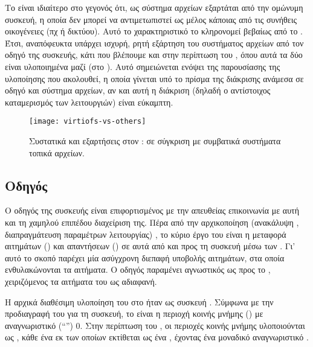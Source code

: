 Το \viofs{} είναι ιδιαίτερο στο γεγονός ότι, ως σύστημα αρχείων εξαρτάται από
την ομώνυμη συσκευή, η οποία δεν μπορεί να αντιμετωπιστεί ως μέλος κάποιας από
τις συνήθεις οικογένειες (πχ  ή δικτύου). Αυτό το χαρακτηριστικό το
κληρονομεί βεβαίως από το . Έτσι, αναπόφευκτα υπάρχει ισχυρή, ρητή
εξάρτηση του \viofs{} συστήματος αρχείων από τον οδηγό της \viofs{} συσκευής,
κάτι που βλέπουμε και στην περίπτωση του \linux{}, όπου αυτά τα δύο είναι
υλοποιημένα μαζί (στο ). Αυτό σημειώνεται ενόψει της
παρουσίασης της υλοποίησης που ακολουθεί, η οποία γίνεται υπό το πρίσμα της
διάκρισης ανάμεσα σε οδηγό και σύστημα αρχείων, αν και αυτή η διάκριση (δηλαδή
ο αντίστοιχος καταμερισμός των λειτουργιών) είναι εύκαμπτη.

\begin{figure}
    \centering
    \texttt{[image: virtiofs-vs-others]}
    \caption{Συστατικά και εξαρτήσεις στον \guest{}: \viofs{} σε σύγκριση με
        συμβατικά συστήματα τοπικά αρχείων.}
    \label{fig:virtiofs-vs-others}
\end{figure}

\subsection{Οδηγός}

Ο οδηγός της \viofs{} συσκευής είναι επιφορτισμένος με την απευθείας επικοινωνία
με αυτή και τη χαμηλού επιπέδου διαχείριση της. Πέρα από την αρχικοποίηση
(ανακάλυψη , διαπραγμάτευση παραμέτρων λειτουργίας)
\cite{virtio}, το κύριο έργο του είναι η μεταφορά αιτημάτων () και
απαντήσεων () σε αυτά από και προς τη συσκευή μέσω των
. Γι' αυτό το σκοπό παρέχει μία ασύγχρονη διεπαφή υποβολής
αιτημάτων, στα οποία ενθυλακώνονται τα  αιτήματα. Ο οδηγός παραμένει
αγνωστικός ως προς το , χειριζόμενος τα αιτήματα του ως αδιαφανή.

Η αρχικά διαθέσιμη υλοποίηση του \viofs{}  στο \qemu{} ήταν ως
συσκευή . Σύμφωνα με την προδιαγραφή του  \cite{virtio}
για τη συσκευή, το  είναι η περιοχή κοινής μνήμης () με αναγνωριστικό (``'') 0. Στην περίπτωση του
, οι περιοχές κοινής μνήμης υλοποιούνται ως
, κάθε ένα εκ των οποίων εκτίθεται ως ένα
, έχοντας ένα μοναδικό
αναγνωριστικό \cite{virtio, wiki:pci-conf, osdev:pci}.

